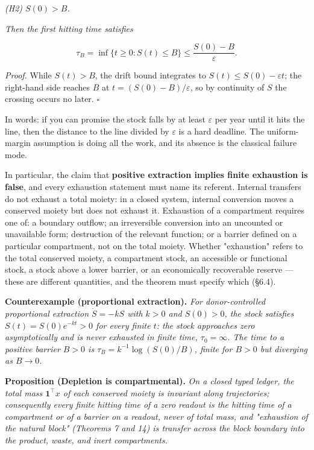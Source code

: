 \documentclass[11pt]{article}
\begin{document}
\emph{(H2) \(S(0) > B\).}

\emph{Then the first hitting time satisfies} 

$$\tau_B = \inf\{ t \ge 0 : S(t) \le B \} \le \frac{S(0) - B}{\varepsilon}.$$



\emph{Proof.} While \(S(t) > B\), the drift bound integrates to \(S(t) \le S(0) - \varepsilon t\); the right-hand side reaches \(B\) at \(t = (S(0) - B)/\varepsilon\), so by continuity of \(S\) the crossing occurs no later. \(\square\)

In words: if you can promise the stock falls by at least \(\varepsilon\) per year until it hits the line, then the distance to the line divided by \(\varepsilon\) is a hard deadline. The uniform-margin assumption is doing all the work, and its absence is the classical failure mode.

In particular, the claim that \textbf{positive extraction implies finite exhaustion is false}, and every exhaustion statement must name its referent. Internal transfers do not exhaust a total moiety: in a closed system, internal conversion moves a conserved moiety but does not exhaust it. Exhaustion of a compartment requires one of: a boundary outflow; an irreversible conversion into an uncounted or unavailable form; destruction of the relevant function; or a barrier defined on a particular compartment, not on the total moiety. Whether "exhaustion" refers to the total conserved moiety, a compartment stock, an accessible or functional stock, a stock above a lower barrier, or an economically recoverable reserve --- these are different quantities, and the theorem must specify which (\S6.4).

\textbf{Counterexample (proportional extraction).} \emph{For donor-controlled proportional extraction \(\dot S = -kS\) with \(k > 0\) and \(S(0) > 0\), the stock satisfies \(S(t) = S(0)e^{-kt} > 0\) for every finite \(t\): the stock approaches zero asymptotically and is never exhausted in finite time, \(\tau_0 = \infty\). The time to a positive barrier \(B > 0\) is \(\tau_B = k^{-1}\log(S(0)/B)\), finite for \(B > 0\) but diverging as \(B \to 0\).}

\textbf{Proposition (Depletion is compartmental).} \emph{On a closed typed ledger, the total mass \(\mathbf{1}^\top x\) of each conserved moiety is invariant along trajectories; consequently every finite hitting time of a zero readout is the hitting time of a compartment or of a barrier on a readout, never of total mass, and "exhaustion of the natural block" (Theorems 7 and 14) is transfer across the block boundary into the product, waste, and inert compartments.}
\end{document}
